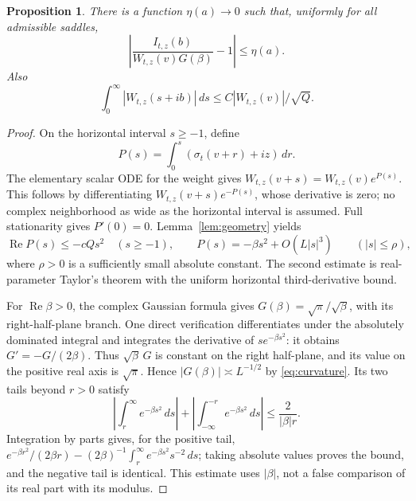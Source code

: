 \documentclass[11pt]{article}
\newtheorem{proposition}[theorem]{Proposition}
\theoremstyle{remark}\newtheorem{remark}[theorem]{Remark}
\DeclareMathOperator{\Rea}{Re}\DeclareMathOperator{\Ima}{Im}
\begin{document}
\begin{proposition}\label{prop:horizontal}
There is a function $\eta(a)\to0$ such that, uniformly for
all admissible saddles,
\begin{equation}\label{eq:horizontal}
 \left|\frac{I_{t,z}(b)}{W_{t,z}(v)G(\beta)}-1\right|
                          \leq\eta(a).
\end{equation}
Also
\begin{equation}\label{eq:absolutemass}
 \int_0^\infty|W_{t,z}(s+ib)|\,ds
                     \leq C|W_{t,z}(v)|/\sqrt Q.
\end{equation}
\end{proposition}
\begin{proof}
On the horizontal interval $s\geq-1$, define
\[
 P(s)=\int_0^s(\sigma_t(v+r)+iz)\,dr.
\]
The elementary scalar ODE for the weight gives
$W_{t,z}(v+s)=W_{t,z}(v)e^{P(s)}$. This follows by
differentiating $W_{t,z}(v+s)e^{-P(s)}$, whose derivative
is zero; no complex neighborhood as wide as the horizontal
interval is assumed. Full stationarity gives $P'(0)=0$.
Lemma~\ref{lem:geometry} yields
\begin{equation}\label{eq:Pbounds}
 \Rea P(s)\leq-cQs^2\quad(s\geq-1),\qquad
 P(s)=-\beta s^2+O(L|s|^3)\qquad(|s|\leq\rho),
\end{equation}
where $\rho>0$ is a sufficiently small absolute constant.
The second estimate is real-parameter Taylor's theorem with
the uniform horizontal third-derivative bound.

For $\Rea\beta>0$, the complex Gaussian formula gives
$G(\beta)=\sqrt\pi/\sqrt\beta$, with its right-half-plane
branch. One direct verification differentiates under the
absolutely dominated integral and integrates the derivative
of $s e^{-\beta s^2}$: it obtains $G'=-G/(2\beta)$.
Thus $\sqrt\beta\,G$ is constant on the right half-plane,
and its value on the positive real axis is $\sqrt\pi$.
Hence $|G(\beta)|\asymp L^{-1/2}$ by
\eqref{eq:curvature}. Its two tails beyond $r>0$ satisfy
\begin{equation}\label{eq:oscgaussian}
 \left|\int_r^\infty e^{-\beta s^2}\,ds\right|
 +\left|\int_{-\infty}^{-r} e^{-\beta s^2}\,ds\right|
                           \leq\frac2{|\beta|r}.
\end{equation}
Integration by parts gives, for the positive tail,
$e^{-\beta r^2}/(2\beta r)
 -(2\beta)^{-1}\int_r^\infty e^{-\beta s^2}s^{-2}\,ds$;
taking absolute values proves the bound, and the negative tail
is identical. This estimate uses $|\beta|$, not a false
comparison of its real part with its modulus.


\end{proof}
\end{document}
